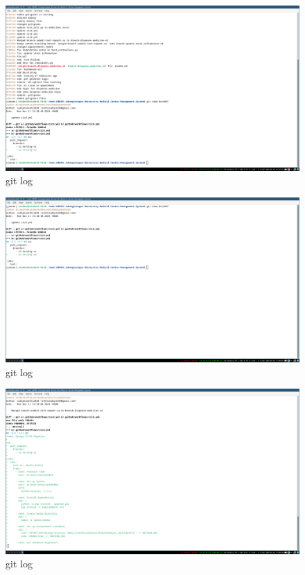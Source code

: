 \documentclass[a4paper,12pt]{article}
\begin{document}
\begin{figure}[H]
    \centering
    \includegraphics[width=1\textwidth]{images/meet42.png}
    \caption{git log}
    \label{fig:meet42}
\end{figure}


\begin{figure}[H]
    \centering
    \includegraphics[width=1\textwidth]{images/meet43.png}
    \caption{git log}
    \label{fig:meet43}
\end{figure}

\begin{figure}[H]
    \centering
    \includegraphics[width=1\textwidth]{images/meet44.png}
    \caption{git log}
    \label{fig:meet44}
\end{figure}
\end{document}
